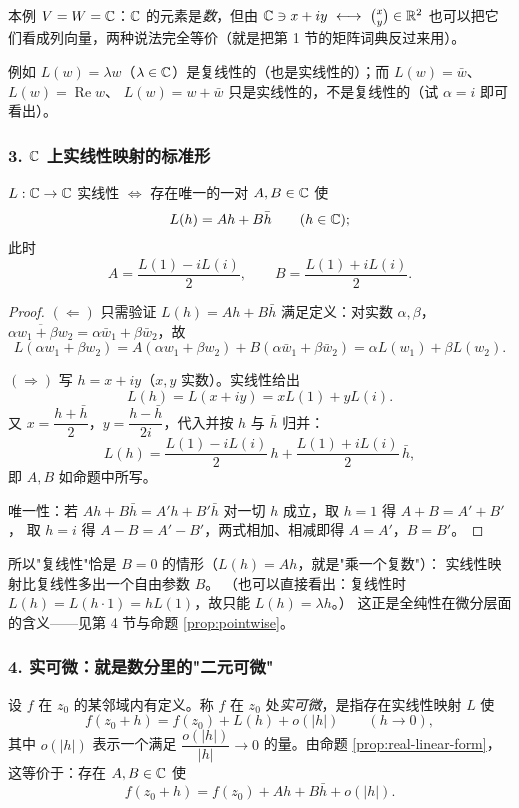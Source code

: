 \noindent
本例 $V=W=\mathbb{C}$：$\mathbb{C}$ 的元素是\emph{数}，但由 $\C\ni x+iy\ \longleftrightarrow\ \binom{x}{y}\in\R^2$
也可以把它们看成列向量，两种说法完全等价（就是把第 1 节的矩阵词典反过来用）。

例如 $L(w)=\lambda w$（$\lambda\in\mathbb{C}$）是复线性的（也是实线性的）；而 $L(w)=\bar w$、$L(w)=\operatorname{Re}w$、
$L(w)=w+\bar w$ 只是实线性的，不是复线性的（试 $\alpha=i$ 即可看出）。

\subsubsection*{3. $\mathbb{C}$ 上实线性映射的标准形}

\begin{proposition}[实线性映射的标准形]\label{prop:real-linear-form}
$L:\mathbb{C}\to\mathbb{C}$ 实线性 $\iff$ 存在唯一的一对 $A,B\in\mathbb{C}$ 使
\[
L(h)=Ah+B\bar h\qquad(h\in\mathbb{C});
\]
此时
\[
A=\frac{L(1)-iL(i)}{2},\qquad B=\frac{L(1)+iL(i)}{2}.
\]
\end{proposition}

\begin{proof}
$(\Leftarrow)$ 只需验证 $L(h)=Ah+B\bar h$ 满足定义：对实数 $\alpha,\beta$，
$\overline{\alpha w_1+\beta w_2}=\alpha\bar w_1+\beta\bar w_2$，故
\[
L(\alpha w_1+\beta w_2)=A(\alpha w_1+\beta w_2)+B(\alpha\bar w_1+\beta\bar w_2)
=\alpha L(w_1)+\beta L(w_2).
\]

$(\Rightarrow)$ 写 $h=x+iy$（$x,y$ 实数）。实线性给出
\[
L(h)=L(x+iy)=xL(1)+yL(i).
\]
又 $x=\dfrac{h+\bar h}{2}$，$y=\dfrac{h-\bar h}{2i}$，代入并按 $h$ 与 $\bar h$ 归并：
\[
L(h)=\frac{L(1)-iL(i)}{2}\,h+\frac{L(1)+iL(i)}{2}\,\bar h,
\]
即 $A,B$ 如命题中所写。

唯一性：若 $Ah+B\bar h=A'h+B'\bar h$ 对一切 $h$ 成立，取 $h=1$ 得 $A+B=A'+B'$，
取 $h=i$ 得 $A-B=A'-B'$，两式相加、相减即得 $A=A'$，$B=B'$。
\end{proof}

\noindent
所以"复线性"恰是 $B=0$ 的情形（$L(h)=Ah$，就是"乘一个复数"）：
实线性映射比复线性多出一个自由参数 $B$。
（也可以直接看出：复线性时 $L(h)=L(h\cdot 1)=hL(1)$，故只能 $L(h)=\lambda h$。）
这正是全纯性在微分层面的含义——见第 4 节与命题 \ref{prop:pointwise}。

\subsubsection*{4. 实可微：就是数分里的"二元可微"}

\begin{definition}[实可微]
设 $f$ 在 $z_0$ 的某邻域内有定义。称 $f$ 在 $z_0$ 处\emph{实可微}，是指存在实线性映射 $L$ 使
\[
f(z_0+h)=f(z_0)+L(h)+o(|h|)\qquad(h\to0),
\]
其中 $o(|h|)$ 表示一个满足 $\dfrac{o(|h|)}{|h|}\to0$ 的量。由命题 \ref{prop:real-linear-form}，
这等价于：存在 $A,B\in\mathbb{C}$ 使
\[
f(z_0+h)=f(z_0)+Ah+B\bar h+o(|h|).
\]
\end{definition}

